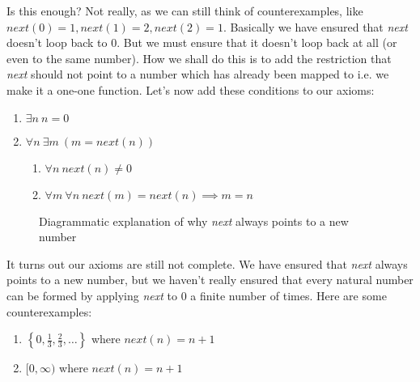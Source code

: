 \documentclass[a4paper,10pt]{article}
\theoremstyle{definition} %
\begin{document}
    Is this enough? Not really, as we can still think of counterexamples, like
    $next(0) = 1, next(1) = 2, next(2) = 1$. Basically we have ensured that \emph{next}
    doesn't loop back to 0. But we must ensure that it doesn't loop back at all 
    (or even to the same number). How we shall do this is to add the restriction that 
    \emph{next} should not point to a number which has already been mapped to i.e. we make
    it a one-one function. Let's now add these conditions to our axioms:

    \begin{tcolorbox}[colback=blue!10!white, colframe=blue!50!black]
        \begin{enumerate}
            \item $\exists n \ n = 0$
            \item $\forall n \ \exists m \ (m = next(n))$
            \begin{enumerate}
                \item $\forall n \ next(n) \neq 0$
                \item $\forall m \ \forall n \ next(m) = next(n) \implies m = n$
            \end{enumerate}
        \end{enumerate}
    \end{tcolorbox}

    \begin{figure}[ht]
    \centering
    \caption{Diagrammatic explanation of why \emph{next} always points to a new number}
    \end{figure}

    It turns out our axioms are still not complete. We have ensured that \emph{next}
    always points to a new number, but we haven't really ensured that every natural
    number can be formed by applying \emph{next} to 0 a finite number of times. 
    Here are some counterexamples:
    \begin{enumerate}
        \item $\left\{0, \frac{1}{3}, \frac{2}{3}, \dots\right\}$ where $next(n) = n+1$ 
        \item $[0, \infty)$ where $next(n) = n+1$
    \end{enumerate}
    
\end{document}
